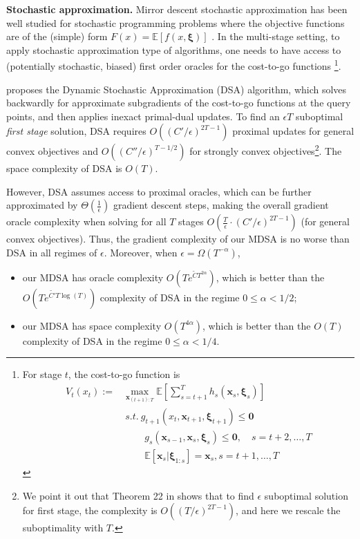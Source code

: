 \documentclass[11pt,fullpage,letterpaper]{article}
\newcommand{\mb}{\mathbf}
\newcommand{\E}{\mathbb{E}}
\newcommand{\bx}{\boldsymbol{\xi}}
\begin{document}
\textbf{Stochastic approximation.} Mirror descent stochastic approximation has been well studied for stochastic programming problems where the objective functions are of the (simple) form $F(x) = \E[f(x,\bx)]$ \cite{JuditskyNemirovskiTauvel2011,lan_optimal_2012,LanBook,NemirovskiRobustSA2009,Shapiro2021Lectures}. In the multi-stage setting, to apply stochastic approximation type of algorithms, one needs to have access to (potentially stochastic, biased) first order oracles for the cost-to-go functions \footnote{For stage $t$, the cost-to-go function is \begin{align*}
    V_t(x_t) := &\max_{\mb x_{(t+1):T}}\E[\sum_{s=t+1}^Th_s(\mb x_s,\bx_s)]\\
    &~s.t.~ g_{t+1}(x_t,\mb x_{t+1},\bx_{t+1})\leq \mb 0\\
    &~\quad \quad  g_{s}(\mb x_{s-1},\mb x_{s},\bx_{s})\leq \mb 0,\quad s = t+2,\ldots,T\\
    &~\quad\quad \E[\mb x_{s}|\bx_{1:s}] = \mb x_s,s=t+1,\ldots,T
\end{align*}}. 

\cite{lan_dynamic_2021} proposes the Dynamic Stochastic Approximation (DSA) algorithm, which solves backwardly for approximate subgradients of the cost-to-go functions at the query points, and then applies inexact primal-dual updates. To find an $\epsilon T$ suboptimal \textit{first stage} solution, DSA requires $O((C'/\epsilon)^{2T-1})$ proximal updates for general convex objectives and $O((C''/\epsilon)^{T-1/2})$ for strongly convex objectives\footnote{We point it out that Theorem 22 in \cite{lan_dynamic_2021} shows that to find $\epsilon$ suboptimal solution for first stage, the complexity is $O((T/\epsilon)^{2T-1})$, and here we rescale the suboptimality with $T$.}. The space complexity of DSA is $O(T)$. 

However, DSA assumes access to proximal oracles, which can be further approximated by $\Theta(\frac{1}{\epsilon})$ gradient descent steps, making the overall gradient oracle complexity when solving for all $T$ stages $O(\frac{T}{\epsilon}\cdot (C'/\epsilon)^{2T-1})$ (for general convex objectives). Thus, the gradient complexity of our MDSA is no worse than DSA in all regimes of $\epsilon$. Moreover, when $\epsilon = \Omega(T^{-\alpha})$, 
    \begin{itemize}
        \item our MDSA has oracle complexity $O(Te^{\widetilde{C}T^{2\alpha}})$, which is better than the $O(Te^{\widetilde{C'}T\log(T)})$ complexity of DSA in the regime $0\leq \alpha<1/2$;
        \item our MDSA has space complexity $O(T^{4\alpha})$, which is better than the $O(T)$ complexity of DSA in the regime $0\leq \alpha<1/4$. 
    \end{itemize}
\end{document}
